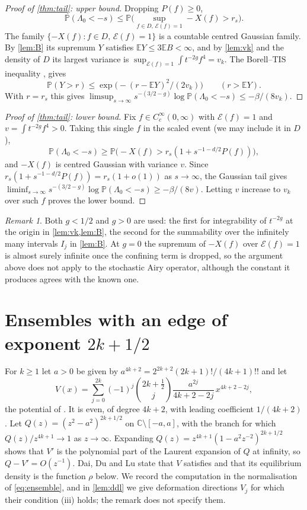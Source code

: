 \documentclass[11pt]{article}
\theoremstyle{remark}
\newtheorem{remark}[theorem]{Remark}
\newcommand{\E}{\mathbb{E}}
\newcommand{\Prob}{\mathbb{P}}
\newcommand{\C}{\mathbb{C}}
\begin{document}
\begin{proof}[Proof of \cref{thm:tail}: upper bound]
Dropping $P(f)\ge0$,
\[
\Prob(\Lambda_0<-s)\le\Prob\Big(\sup_{f\in D,\,\mathcal E(f)=1}-X(f)>r_s\Big).
\]
The family $\{-X(f):f\in D,\,\mathcal E(f)=1\}$ is a countable centred Gaussian family. By \cref{lem:B} its supremum $Y$
satisfies $\E Y\le3\E B<\infty$, and by \cref{lem:vk} and the density of $D$ its largest variance is
$\sup_{\mathcal E(f)=1}\int t^{-2g}f^4=v_k$. The Borell--TIS inequality \cite{Borell,TIS}, \cite[Theorem~2.1.1]{AT} gives
\[
\Prob(Y>r)\le\exp\bigl(-(r-\E Y)^2/(2v_k)\bigr)\qquad(r>\E Y).
\]
With $r=r_s$ this gives
$\limsup_{s\to\infty}s^{-(3/2-g)}\log\Prob(\Lambda_0<-s)\le-\beta/(8v_k)$.
\end{proof}

\begin{proof}[Proof of \cref{thm:tail}: lower bound]
Fix $f\in C_c^\infty(0,\infty)$ with $\mathcal E(f)=1$ and $v=\int t^{-2g}f^4>0$. Taking this single $f$ in the scaled
event (we may include it in $D$),
\[
\Prob(\Lambda_0<-s)\ge\Prob\bigl(-X(f)>r_s(1+s^{-1-d/2}P(f))\bigr),
\]
and $-X(f)$ is centred Gaussian with variance $v$. Since $r_s(1+s^{-1-d/2}P(f))=r_s(1+o(1))$ as $s\to\infty$, the Gaussian tail gives
$\liminf_{s\to\infty}s^{-(3/2-g)}\log\Prob(\Lambda_0<-s)\ge-\beta/(8v)$. Letting $v$ increase to $v_k$ over such $f$
proves the lower bound.
\end{proof}

\begin{remark}\label{rem:k0}
Both $g<1/2$ and $g>0$ are used: the first for integrability of $t^{-2g}$ at the origin in \cref{lem:vk,lem:B}, the
second for the summability over the infinitely many intervals $I_j$ in \cref{lem:B}. At $g=0$ the supremum of
$-X(f)$ over $\mathcal E(f)=1$ is almost surely infinite once the confining term is dropped, so the argument above does not
apply to the stochastic Airy operator, although the constant it produces agrees with the known one.
\end{remark}

\section{Ensembles with an edge of exponent \texorpdfstring{$2k+1/2$}{2k+1/2}}\label{sec:ensemble}

For $k\ge1$ let $a>0$ be given by $a^{4k+2}=2^{2k+2}(2k+1)!/(4k+1)!!$ and let
\[
V(x)=\sum_{j=0}^{2k}(-1)^j\binom{2k+\frac12}{j}\frac{a^{2j}}{4k+2-2j}\,x^{4k+2-2j},
\]
the potential of \cite[Remark~1.7]{DDL}. It is even, of degree $4k+2$, with leading coefficient $1/(4k+2)$. Let
$Q(z)=(z^2-a^2)^{2k+1/2}$ on $\C\setminus[-a,a]$, with the branch for which $Q(z)/z^{4k+1}\to1$ as $z\to\infty$. Expanding
$Q(z)=z^{4k+1}(1-a^2z^{-2})^{2k+1/2}$ shows that $V'$ is the polynomial part of the Laurent expansion of $Q$ at infinity,
so $Q-V'=O(z^{-1})$. Dai, Du and Lu \cite[Remark~1.7]{DDL} state that $V$ satisfies \cite[Assumptions~1.1]{DDL} and
that its equilibrium density is the function $\rho$ below. We record the computation in the normalisation of
\eqref{eq:ensemble}, and in \cref{lem:ddl} we give deformation directions $V_j$ for which their condition (iii) holds;
the remark does not specify them.
\end{document}
